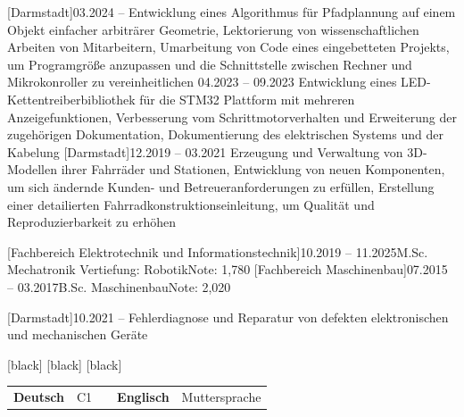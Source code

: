 \documentclass[
	themeColor=blue,
	lang=DE,
	titleStyle=2,
	jobExpStyle=2,
	eduStyle=2
]{../templates/cv_res}
\begin{document}
\maketitle

	[Darmstadt]{03.2024 -- }{%
	{Entwicklung eines Algorithmus für Pfadplannung auf einem Objekt einfacher arbiträrer Geometrie},
	{Lektorierung von wissenschaftlichen Arbeiten von Mitarbeitern},
	{Umarbeitung von Code eines eingebetteten Projekts, um Programgröße anzupassen und die Schnittstelle zwischen Rechner und Mikrokonroller zu vereinheitlichen}
}
{04.2023 -- 09.2023}{%
	{Entwicklung eines LED-Kettentreiberbibliothek für die STM32 Plattform mit mehreren Anzeigefunktionen},
	{Verbesserung vom Schrittmotorverhalten und Erweiterung der zugehörigen Dokumentation},
	{Dokumentierung des elektrischen Systems und der Kabelung}
}
[Darmstadt]{12.2019 -- 03.2021}{%
  {Erzeugung und Verwaltung von 3D-Modellen ihrer Fahrräder und Stationen},
  {Entwicklung von neuen Komponenten, um sich ändernde Kunden- und Betreueranforderungen zu erfüllen},
  {Erstellung einer detailierten Fahrradkonstruktionseinleitung, um Qualität und Reproduzierbarkeit zu erhöhen}
}

[Fachbereich Elektrotechnik und Informationstechnik]{10.2019 -- 11.2025}{M.Sc. Mechatronik Vertiefung: Robotik}{Note: 1,780}
[Fachbereich Maschinenbau]{07.2015 -- 03.2017}{B.Sc. Maschinenbau}{Note: 2,020}

[Darmstadt]{10.2021 -- }{%
	{Fehlerdiagnose und Reparatur von defekten elektronischen und mechanischen Geräte}
}


[black]
\hfil
{}[black]
\hfil
{}[black]

\begin{center}
	\large%
	\begin{tabular}{p{18mm} p{30mm} p{24mm} p{18mm} p{30mm}}
		\hline
		\textbf{Deutsch} & C1 & & \textbf{Englisch} & Muttersprache
	\end{tabular}
\end{center}
\end{document}
